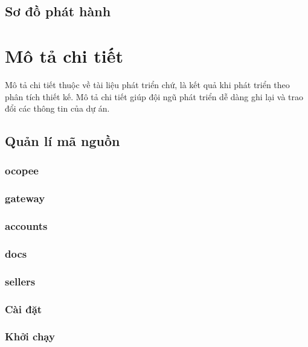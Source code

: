 \documentclass[11pt]{report}
\begin{document}
\subsection{Sơ đồ phát hành}







\section{Mô tả chi tiết}
Mô tả chi tiết thuộc về tài liệu phát triển chứ, là kết quả khi phát triển theo phân tích thiết kế. Mô tả chi tiết giúp đội ngũ phát triển dễ dàng ghi lại và trao đổi các thông tin của dự án.





\subsection{Quản lí mã nguồn}
\subsubsection{ocopee}
\subsubsection{gateway}
\subsubsection{accounts}
\subsubsection{docs}
\subsubsection{sellers}
\subsubsection{Cài đặt}
\subsubsection{Khởi chạy}
\end{document}
